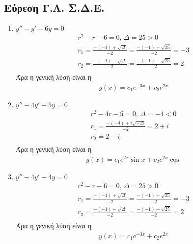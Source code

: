 \documentclass[]{book}
\begin{document}
\begin{multicols*}{2}
\subsection{Εύρεση Γ.Λ. Σ.Δ.Ε.}
\begin{enumerate}
    \item \( y''  -y' - 6y = 0 \)
    \begin{equation*}
        \begin{aligned}
            r^2 - r - 6 = 0 \text{, } \Delta = 25 > 0                         \\
            r_1 = \frac{-(-1)+\sqrt{Δ}}{-2} = \frac{-(-1)+\sqrt{25}}{-2} = -3 \\
            r_2 = \frac{-(-1)-\sqrt{Δ}}{-2} = \frac{-(-1)-\sqrt{25}}{-2} = 2  \\
        \end{aligned}
    \end{equation*}
    Άρα η γενική λύση είναι η
    \begin{equation*}
        \begin{aligned}
            y(x) = c_1 e^{-3x} + c_2 e^{2x}
        \end{aligned}
    \end{equation*}
    \item \( y'' -4y' - 5y = 0 \)
    \begin{equation*}
        \begin{aligned}
            r^2 - 4r - 5 = 0 \text{, } \Delta = -4 < 0 \\
            r_1 = \frac{-(-4)+i\sqrt{-Δ}}{-2} = 2 + i  \\
            r_2 = 2 - i                                \\
        \end{aligned}
    \end{equation*}
    Άρα η γενική λύση είναι η
    \begin{equation*}
        \begin{aligned}
            y(x) = c_1 e^{2x} \sin{x} + c_2 e^{2x} \cos{}
        \end{aligned}
    \end{equation*}
    \item \( y'' -4y' - 4y = 0 \)
\begin{equation*}
    \begin{aligned}
        r^2 - r - 6 = 0 \text{, } \Delta = 25 > 0                         \\
        r_1 = \frac{-(-1)+\sqrt{Δ}}{-2} = \frac{-(-1)+\sqrt{25}}{-2} = -3 \\
        r_2 = \frac{-(-1)-\sqrt{Δ}}{-2} = \frac{-(-1)-\sqrt{25}}{-2} = 2  \\
    \end{aligned}
\end{equation*}
Άρα η γενική λύση είναι η
\begin{equation*}
    \begin{aligned}
        y(x) = c_1 e^{-3x} + c_2 e^{2x}
    \end{aligned}
\end{equation*}
\end{enumerate}

\end{multicols*}
\end{document}
